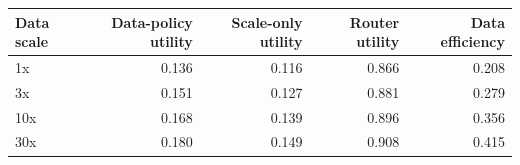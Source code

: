 \begin{tabular}{lrrrr}
\toprule
Data scale & Data-policy utility & Scale-only utility & Router utility & Data efficiency \\
\midrule
1x & 0.136 & 0.116 & 0.866 & 0.208 \\
3x & 0.151 & 0.127 & 0.881 & 0.279 \\
10x & 0.168 & 0.139 & 0.896 & 0.356 \\
30x & 0.180 & 0.149 & 0.908 & 0.415 \\
\bottomrule
\end{tabular}
